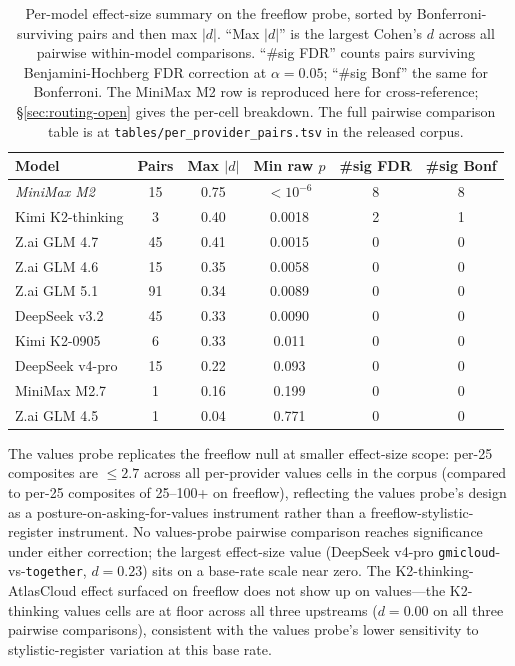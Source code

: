 \documentclass[11pt,a4paper]{article}
\begin{document}
\begin{table}[h]
\centering
\caption{Per-model effect-size summary on the freeflow probe, sorted by Bonferroni-surviving pairs and then max $|d|$. ``Max $|d|$'' is the largest Cohen's $d$ across all pairwise within-model comparisons. ``\#sig FDR'' counts pairs surviving Benjamini-Hochberg FDR correction at $\alpha{=}0.05$; ``\#sig Bonf'' the same for Bonferroni. The MiniMax M2 row is reproduced here for cross-reference; \S\ref{sec:routing-open} gives the per-cell breakdown. The full pairwise comparison table is at \texttt{tables/per\_provider\_pairs.tsv} in the released corpus.}
\label{tab:per-provider-summary}
\small
\begin{tabular}{lccccc}
\toprule
\textbf{Model} & \textbf{Pairs} & \textbf{Max $|d|$} & \textbf{Min raw $p$} & \textbf{\#sig FDR} & \textbf{\#sig Bonf} \\
\midrule
\emph{MiniMax M2}   & 15 & 0.75    & ${<}10^{-6}$  & 8 & 8 \\
Kimi K2-thinking    &  3 & 0.40    & 0.0018        & 2 & 1 \\
\midrule
Z.ai GLM 4.7        & 45 & 0.41    & 0.0015        & 0 & 0 \\
Z.ai GLM 4.6        & 15 & 0.35    & 0.0058        & 0 & 0 \\
Z.ai GLM 5.1        & 91 & 0.34    & 0.0089        & 0 & 0 \\
DeepSeek v3.2       & 45 & 0.33    & 0.0090        & 0 & 0 \\
Kimi K2-0905        &  6 & 0.33    & 0.011         & 0 & 0 \\
DeepSeek v4-pro     & 15 & 0.22    & 0.093         & 0 & 0 \\
MiniMax M2.7        &  1 & 0.16    & 0.199         & 0 & 0 \\
Z.ai GLM 4.5        &  1 & 0.04    & 0.771         & 0 & 0 \\
\bottomrule
\end{tabular}
\end{table}

The values probe replicates the freeflow null at smaller effect-size scope: per-25 composites are $\leq 2.7$ across all per-provider values cells in the corpus (compared to per-25 composites of 25--100+ on freeflow), reflecting the values probe's design as a posture-on-asking-for-values instrument rather than a freeflow-stylistic-register instrument. No values-probe pairwise comparison reaches significance under either correction; the largest effect-size value (DeepSeek v4-pro \texttt{gmicloud}-vs-\texttt{together}, $d{=}0.23$) sits on a base-rate scale near zero. The K2-thinking-AtlasCloud effect surfaced on freeflow does not show up on values---the K2-thinking values cells are at floor across all three upstreams ($d{=}0.00$ on all three pairwise comparisons), consistent with the values probe's lower sensitivity to stylistic-register variation at this base rate.
\end{document}
